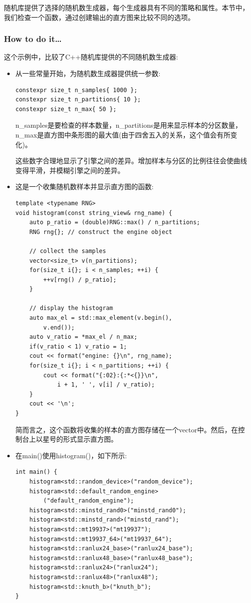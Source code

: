 
随机库提供了选择的随机数生成器，每个生成器具有不同的策略和属性。本节中，我们检查一个函数，通过创建输出的直方图来比较不同的选项。

\subsubsection{How to do it…}

这个示例中，比较了C++随机库提供的不同随机数生成器:

\begin{itemize}
\item 
从一些常量开始，为随机数生成器提供统一参数:

\begin{lstlisting}[style=styleCXX]
constexpr size_t n_samples{ 1000 };
constexpr size_t n_partitions{ 10 };
constexpr size_t n_max{ 50 };
\end{lstlisting}

n\_samples是要检查的样本数量，n\_partitions是用来显示样本的分区数量，n\_max是直方图中条形图的最大值(由于四舍五入的关系，这个值会有所变化)。

这些数字合理地显示了引擎之间的差异。增加样本与分区的比例往往会使曲线变得平滑，并模糊引擎之间的差异。

\item 
这是一个收集随机数样本并显示直方图的函数:

\begin{lstlisting}[style=styleCXX]
template <typename RNG>
void histogram(const string_view& rng_name) {
	auto p_ratio = (double)RNG::max() / n_partitions;
	RNG rng{}; // construct the engine object
	
	// collect the samples
	vector<size_t> v(n_partitions);
	for(size_t i{}; i < n_samples; ++i) {
		++v[rng() / p_ratio];
	}

	// display the histogram
	auto max_el = std::max_element(v.begin(),
		v.end());
	auto v_ratio = *max_el / n_max;
	if(v_ratio < 1) v_ratio = 1;
	cout << format("engine: {}\n", rng_name);
	for(size_t i{}; i < n_partitions; ++i) {
		cout << format("{:02}:{:*<{}}\n",
			i + 1, ' ', v[i] / v_ratio);
	}
	cout << '\n';
}
\end{lstlisting}


简而言之，这个函数将收集的样本的直方图存储在一个vector中。然后，在控制台上以星号的形式显示直方图。

\item 
在main()使用histogram()，如下所示:

\begin{lstlisting}[style=styleCXX]
int main() {
	histogram<std::random_device>("random_device");
	histogram<std::default_random_engine>
		("default_random_engine");
	histogram<std::minstd_rand0>("minstd_rand0");
	histogram<std::minstd_rand>("minstd_rand");
	histogram<std::mt19937>("mt19937");
	histogram<std::mt19937_64>("mt19937_64");
	histogram<std::ranlux24_base>("ranlux24_base");
	histogram<std::ranlux48_base>("ranlux48_base");
	histogram<std::ranlux24>("ranlux24");
	histogram<std::ranlux48>("ranlux48");
	histogram<std::knuth_b>("knuth_b");
}
\end{lstlisting}


\end{itemize}
